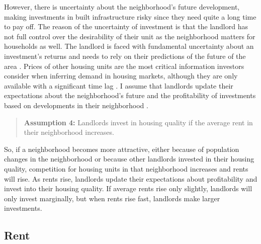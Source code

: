 However, there is uncertainty about the neighborhood's future development, making investments in built infrastructure risky since they need quite a long time to pay off. The reason of the uncertainty of investment is that the landlord has not full control over the desirability of their unit as the neighborhood matters for households as well. The landlord is faced with fundamental uncertainty about an investment's returns and needs to rely on their predictions of the future of the area \citep{whiteheadUrbanHousingMarkets1999, galsterNatureNeighbourhood2001, glaeserExtrapolativeModelHouse2017}. Prices of other housing units are the most critical information investors consider when inferring demand in housing markets, although they are only available with a significant time lag \citep{glaeserExtrapolativeModelHouse2017}. I assume that landlords update their expectations about the neighborhood's future and the profitability of investments based on developments in their neighborhood \citep{galsterNatureNeighbourhood2001, bayerSpeculativeFeverInvestor2021}. 

\begin{quotation}
\textbf{Assumption 4:} Landlords invest in housing quality if the average rent in their neighborhood increases.
\end{quotation}

So, if a neighborhood becomes more attractive, either because of population changes in the neighborhood or because other landlords invested in their housing quality, competition for housing units in that neighborhood increases and rents will rise. As rents rise, landlords update their expectations about profitability and invest into their housing quality. If average rents rise only slightly, landlords will only invest marginally, but when rents rise fast, landlords make larger investments.

\subsection{Rent}

